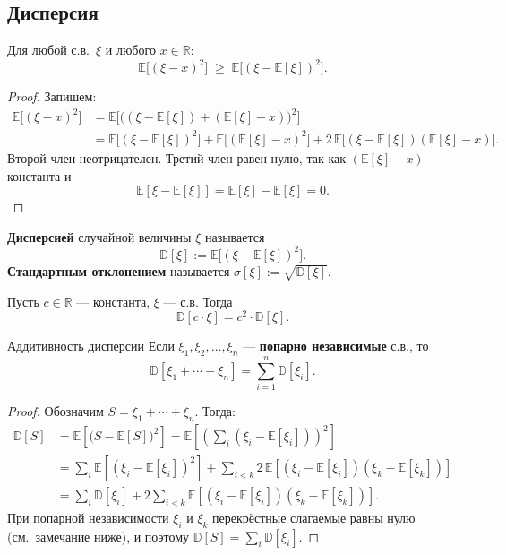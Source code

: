 \subsection{Дисперсия}

\begin{Statement}{}{}
	Для любой с.в.\ $\xi$ и любого $x \in \mathbb{R}$:
	\[
	\mathbb{E}\bigl[(\xi - x)^2\bigr] \;\geq\; \mathbb{E}\bigl[(\xi - \mathbb{E}[\xi])^2\bigr].
	\]
\end{Statement}

\begin{proof}
Запишем:
\begin{align*}
	\mathbb{E}\bigl[(\xi - x)^2\bigr]
	&= \mathbb{E}\bigl[\bigl((\xi - \mathbb{E}[\xi]) + (\mathbb{E}[\xi] - x)\bigr)^2\bigr] \\
	&= \mathbb{E}\bigl[(\xi - \mathbb{E}[\xi])^2\bigr]
	+ \mathbb{E}\bigl[(\mathbb{E}[\xi] - x)^2\bigr]
	+ 2\,\mathbb{E}\bigl[(\xi - \mathbb{E}[\xi])(\mathbb{E}[\xi] - x)\bigr].
\end{align*}
Второй член неотрицателен. Третий член равен нулю, так как $(\mathbb{E}[\xi] - x)$ — константа и
\[
\mathbb{E}[\xi - \mathbb{E}[\xi]] = \mathbb{E}[\xi] - \mathbb{E}[\xi] = 0.
\]
\end{proof}
\begin{Definition}{}{}
	\textbf{Дисперсией} случайной величины $\xi$ называется
	\[
	\mathbb{D}[\xi] := \mathbb{E}\bigl[(\xi - \mathbb{E}[\xi])^2\bigr].
	\]
	\textbf{Стандартным отклонением} называется $\sigma[\xi] := \sqrt{\mathbb{D}[\xi]}$.
\end{Definition}

\begin{Statement}{}{}
	Пусть $c \in \mathbb{R}$ — константа, $\xi$ — с.в. Тогда
	\[
	\mathbb{D}[c \cdot \xi] = c^2 \cdot \mathbb{D}[\xi].
	\]
\end{Statement}

\begin{Theorem}{Аддитивность дисперсии}{}
	Если $\xi_1, \xi_2, \ldots, \xi_n$ — \textbf{попарно независимые} с.в., то
	\[
	\mathbb{D}[\xi_1 + \cdots + \xi_n] = \sum_{i=1}^{n} \mathbb{D}[\xi_i].
	\]
\end{Theorem}

\begin{proof}
	Обозначим $S = \xi_1 + \cdots + \xi_n$. Тогда:
	\begin{align*}
		\mathbb{D}[S]
		&= \mathbb{E}\!\left[\bigl(S - \mathbb{E}[S]\bigr)^2\right]
		= \mathbb{E}\!\left[\left(\sum_i (\xi_i - \mathbb{E}[\xi_i])\right)^2\right] \\
		&= \sum_i \mathbb{E}\!\left[(\xi_i - \mathbb{E}[\xi_i])^2\right]
		+ \sum_{i < k} 2\,\mathbb{E}\!\left[(\xi_i - \mathbb{E}[\xi_i])(\xi_k - \mathbb{E}[\xi_k])\right] \\
		&= \sum_i \mathbb{D}[\xi_i]
		+ 2\sum_{i < k} \mathbb{E}\!\left[(\xi_i - \mathbb{E}[\xi_i])(\xi_k - \mathbb{E}[\xi_k])\right].
	\end{align*}
	При попарной независимости $\xi_i$ и $\xi_k$ перекрёстные слагаемые равны нулю (см.\ замечание ниже), и поэтому $\mathbb{D}[S] = \sum_i \mathbb{D}[\xi_i]$.
\end{proof}

